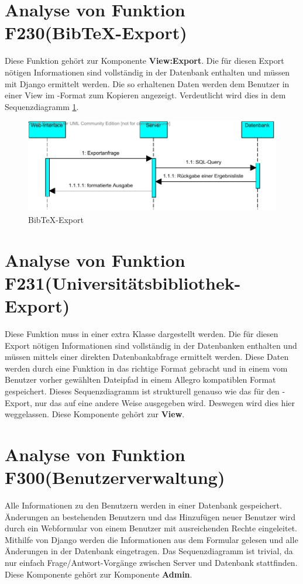 \section{Analyse von Funktion F230(Bib\TeX -Export)}
Diese Funktion gehört zur Komponente \textbf{View:Export}. Die für diesen Export nötigen Informationen sind vollständig in der Datenbank enthalten und müssen mit Django ermittelt werden. Die so erhaltenen Daten werden dem Benutzer in einer View im \BibTeX -Format zum Kopieren angezeigt. Verdeutlicht wird dies in dem Sequenzdiagramm \ref{fig:BibTeX-Export}.

\begin{figure}[h]
\includegraphics[width=0.8\linewidth]{bilder/Seq-BibTex.pdf}
\caption[BibTeX-Export]{BibTeX-Export}
\label{fig:BibTeX-Export}
\end{figure}

\section{Analyse von Funktion F231(Universitätsbibliothek-Export)}

Diese Funktion muss in einer extra Klasse dargestellt werden. Die für diesen Export nötigen Informationen sind vollständig in der Datenbanken enthalten und müssen mittels einer direkten Datenbankabfrage ermittelt werden. Diese Daten werden durch eine Funktion in das richtige Format gebracht und in einem vom Benutzer vorher gewählten Dateipfad in einem Allegro kompatiblen Format gespeichert. Dieses Sequenzdiagramm ist strukturell genauso wie das für den \BibTeX -Export, nur das auf eine andere Weise ausgegeben wird. Deswegen wird dies hier weggelassen. Diese Komponente gehört zur \textbf{View}.


\section{Analyse von Funktion F300(Benutzerverwaltung)}
Alle Informationen zu den Benutzern werden in einer Datenbank gespeichert. Änderungen an bestehenden Benutzern und das Hinzufügen neuer Benutzer wird durch ein Webformular von einem Benutzer mit ausreichenden Rechte eingeleitet. Mithilfe von Django werden die Informationen aus dem Formular gelesen und alle Änderungen in der Datenbank eingetragen. Das Sequenzdiagramm ist trivial, da nur einfach Frage/Antwort-Vorgänge zwischen Server und Datenbank stattfinden. Diese Komponente gehört zur Komponente \textbf{Admin}.

